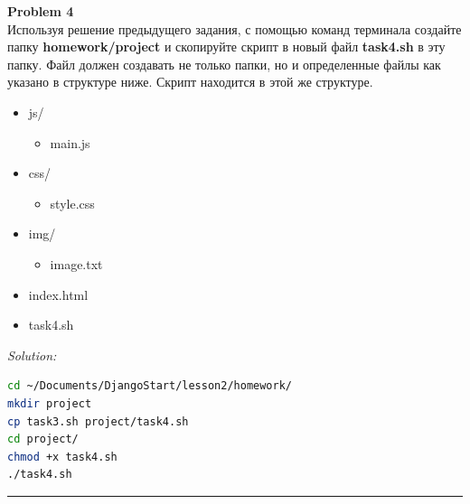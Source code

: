\documentclass[a4paper, 11pt]{extarticle}
\newenvironment{problem}[2][Problem]
    { \begin{mdframed}[backgroundcolor=gray!20] \textbf{#1 #2} \\}
    {  \end{mdframed}}
\newenvironment{solution}
    {\textit{Solution:}}
    {}
\begin{document}
\begin{problem}{4}
Используя решение предыдущего задания, с помощью команд терминала создайте папку \textbf{homework/project} и скопируйте скрипт в новый файл \textbf{task4.sh} в эту папку. Файл должен создавать не только папки, но и определенные файлы как указано в структуре ниже. Скрипт находится в этой же структуре.
\begin{itemize}
\item js/
\begin{itemize}
\item main.js 
\end{itemize}
\item css/
\begin{itemize}
\item style.css
\end{itemize}
\item img/
\begin{itemize}
\item image.txt
\end{itemize}
\item index.html
\item task4.sh
\end{itemize}

\end{problem}
\begin{solution} 
\begin{lstlisting}[language=Bash]
cd ~/Documents/DjangoStart/lesson2/homework/
mkdir project
cp task3.sh project/task4.sh
cd project/
chmod +x task4.sh
./task4.sh
\end{lstlisting}


\end{solution} 
\noindent\rule{6.257in}{2.8pt}
\end{document}
